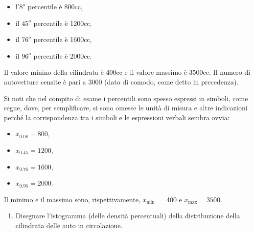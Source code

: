 \documentclass[
  11pt,
]{book}
\providecommand{\tightlist}{%
  \setlength{\itemsep}{0pt}\setlength{\parskip}{0pt}}
\theoremstyle{mytheoremstyle}
\theoremstyle{mydefstyle}
\begin{document}
\begin{itemize}
\tightlist
\item
  l'\(8^{o}\) percentile è 800cc,
\item
  il \(45^{o}\) percentile è 1200cc,
\item
  il \(76^{o}\) percentile è 1600cc,
\item
  il \(96^{o}\) percentile è 2000cc.
\end{itemize}

Il valore minino della cilindrata è 400cc e
il valore massimo è 3500cc.
Il numero di autovetture censite è pari a 3000
(dato di comodo, come detto in precedenza).

Si noti che nel compito di esame i percentili sono spesso
espressi in simboli, come segue, dove, per semplificare,
si sono omesse le unità di misura e altre indicazioni
perché la corrispondenza tra i simboli e le espressioni
verbali sembra ovvia:

\begin{itemize}
\tightlist
\item
  \(x_{0.08}= 800\),
\item
  \(x_{0.45}= 1200\),
\item
  \(x_{0.76}= 1600\),
\item
  \(x_{0.96}= 2000\).
\end{itemize}

Il minimo e il massimo sono, rispettivamente,
\(x_{\min}=\) 400 e \(x_{\max}= 3500\).

\begin{enumerate}
\def\labelenumi{\alph{enumi}.}
\tightlist
\item
  Disegnare l'istogramma (delle densità percentuali) della
  distribuzione della cilindrata delle auto in circolazione.
\end{enumerate}
\end{document}
